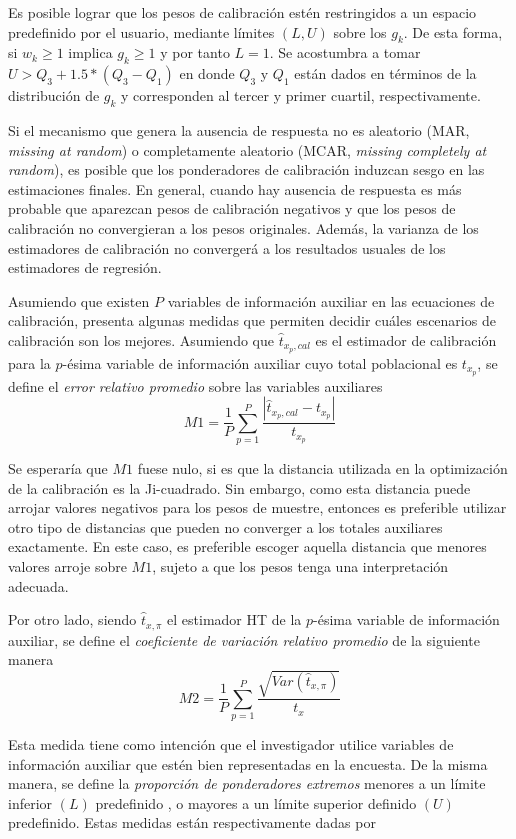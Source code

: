 \documentclass[
  12pt,
]{book}
\begin{document}
Es posible lograr que los pesos de calibración estén restringidos a un espacio predefinido por el usuario, mediante límites \((L, U)\) sobre los \(g_k\). De esta forma, si \(w_k \geq 1\) implica \(g_k \geq 1\) y por tanto \(L=1\). Se acostumbra a tomar \(U > Q_3 + 1.5 * (Q_3 - Q_1)\) en donde \(Q_3\) y \(Q_1\) están dados en términos de la distribución de \(g_k\) y corresponden al tercer y primer cuartil, respectivamente.

Si el mecanismo que genera la ausencia de respuesta no es aleatorio (MAR, \emph{missing at random}) o completamente aleatorio (MCAR, \emph{missing completely at random}), es posible que los ponderadores de calibración induzcan sesgo en las estimaciones finales. En general, cuando hay ausencia de respuesta es más probable que aparezcan pesos de calibración negativos y que los pesos de calibración no convergieran a los pesos originales. Además, la varianza de los estimadores de calibración no convergerá a los resultados usuales de los estimadores de regresión.

Asumiendo que existen \(P\) variables de información auxiliar en las ecuaciones de calibración, \citet{Silva_2004} presenta algunas medidas que permiten decidir cuáles escenarios de calibración son los mejores. Asumiendo que \(\hat{t}_{x_p, cal}\) es el estimador de calibración para la \(p\)-ésima variable de información auxiliar cuyo total poblacional es \(t_{x_p}\), se define el \emph{error relativo promedio} sobre las variables auxiliares
\[
M1= \frac{1}{P} \sum_{p=1}^P \frac{|\hat{t}_{x_p, cal} - t_{x_p}|}{t_{x_p}}
\]

Se esperaría que \(M1\) fuese nulo, si es que la distancia utilizada en la optimización de la calibración es la Ji-cuadrado. Sin embargo, como esta distancia puede arrojar valores negativos para los pesos de muestre, entonces es preferible utilizar otro tipo de distancias que pueden no converger a los totales auxiliares exactamente. En este caso, es preferible escoger aquella distancia que menores valores arroje sobre \(M1\), sujeto a que los pesos tenga una interpretación adecuada.

Por otro lado, siendo \(\hat{t}_{x, \pi}\) el estimador HT de la \(p\)-ésima variable de información auxiliar, se define el \emph{coeficiente de variación relativo promedio} de la siguiente manera
\[
M2= \frac{1}{P} \sum_{p=1}^P \frac{\sqrt{Var(\hat{t}_{x,\pi})}}{t_x} 
\]

Esta medida tiene como intención que el investigador utilice variables de información auxiliar que estén bien representadas en la encuesta. De la misma manera, se define la \emph{proporción de ponderadores extremos} menores a un límite inferior \((L)\) predefinido , o mayores a un límite superior definido \((U)\) predefinido. Estas medidas están respectivamente dadas por
\end{document}
